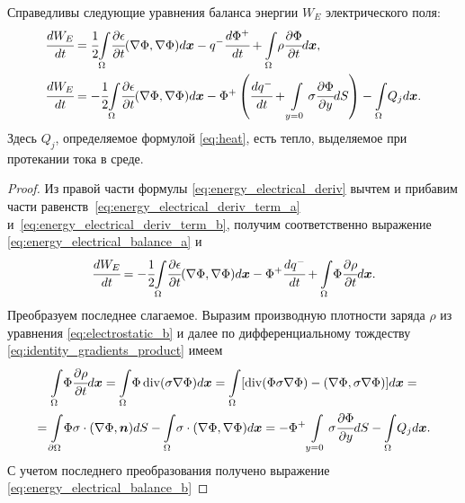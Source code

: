\begin{proposition}
\label{prop:energy_electrical_balance}
Справедливы следующие уравнения баланса энергии $W_E$ электрического поля:
\begin{subequations}
\label{eq:energy_electrical_balance}
\begin{align}
    \cfrac{d W_E}{dt} & = \cfrac{1}{2} {\int\limits_\Omega} \cfrac{\partial \epsilon}{\partial t} (\nabla \Phi, \nabla \Phi) d {\boldsymbol{x}} - q^- \cfrac{d \Phi^+}{dt} + {\int\limits_\Omega} \rho \cfrac{\partial \Phi}{\partial t} d {\boldsymbol{x}},
    \label{eq:energy_electrical_balance_a} \\
    \cfrac{d W_E}{dt} & = -\cfrac{1}{2} {\int\limits_\Omega} \cfrac{\partial \epsilon}{\partial t} (\nabla \Phi, \nabla \Phi) d {\boldsymbol{x}} - \Phi^+ \left( \cfrac{d q^-}{dt} + \int\limits_{y = 0} \sigma \cfrac{\partial \Phi}{\partial y} dS \right) - {\int\limits_\Omega} Q_j d {\boldsymbol{x}}.
    \label{eq:energy_electrical_balance_b}
\end{align}
\end{subequations}
Здесь $Q_j$, определяемое формулой \eqref{eq:heat}, есть тепло, выделяемое при протекании тока в среде.
\end{proposition}
\begin{proof}
Из правой части формулы \eqref{eq:energy_electrical_deriv} вычтем и прибавим части ра\forcehyphenation венств~\eqref{eq:energy_electrical_deriv_term_a} и~\eqref{eq:energy_electrical_deriv_term_b}, получим соответственно выражение \eqref{eq:energy_electrical_balance_a} и
\begin{equation}
    \cfrac{d W_E}{dt} = -\cfrac{1}{2} {\int\limits_\Omega} \cfrac{\partial \epsilon}{\partial t} (\nabla \Phi, \nabla \Phi) d {\boldsymbol{x}} - \Phi^+ \cfrac{d q^-}{dt} + {\int\limits_\Omega} \Phi \cfrac{\partial \rho}{\partial t} d {\boldsymbol{x}}.
    \label{tmp:energy_electrical_deriv}
\end{equation}
Преобразуем последнее слагаемое. Выразим производную плотности заряда $\rho$ из уравнения \eqref{eq:electrostatic_b} и далее по дифференциальному тождеству \eqref{eq:identity_gradients_product} имеем
\begin{multline*}
    {\int\limits_\Omega} \Phi \cfrac{\partial \rho}{\partial t} d {\boldsymbol{x}} = {\int\limits_\Omega} \Phi \operatorname{{div}} (\sigma \nabla \Phi) d {\boldsymbol{x}} = {\int\limits_\Omega} [\operatorname{{div}}(\Phi \sigma \nabla \Phi) - (\nabla \Phi, \sigma \nabla \Phi)] d {\boldsymbol{x}} = \\ = {\int\limits_{\partial \Omega}} \Phi \sigma \cdot (\nabla \Phi, {\boldsymbol{n}}) dS - {\int\limits_\Omega} \sigma \cdot (\nabla \Phi, \nabla \Phi) d {\boldsymbol{x}} = -\Phi^+ \int\limits_{y = 0} \sigma \cfrac{\partial \Phi}{\partial y} dS - {\int\limits_\Omega} Q_j d {\boldsymbol{x}}.
\end{multline*}
С учетом последнего преобразования получено выражение \eqref{eq:energy_electrical_balance_b}
\end{proof}

